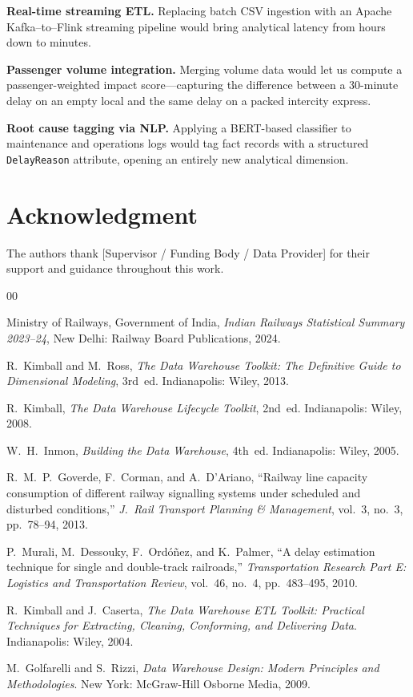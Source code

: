 \documentclass[conference]{IEEEtran}
\begin{document}
\textbf{Real-time streaming ETL.}
Replacing batch CSV ingestion with an Apache Kafka--to--Flink streaming
pipeline would bring analytical latency from hours down to minutes.

\textbf{Passenger volume integration.}
Merging volume data would let us compute a passenger-weighted impact
score---capturing the difference between a 30-minute delay on an empty
local and the same delay on a packed intercity express.

\textbf{Root cause tagging via NLP.}
Applying a BERT-based classifier to maintenance and operations logs would
tag fact records with a structured \texttt{DelayReason} attribute, opening
an entirely new analytical dimension.

\section*{Acknowledgment}
The authors thank [Supervisor / Funding Body / Data Provider]
for their support and guidance throughout this work.

\begin{thebibliography}{00}

Ministry of Railways, Government of India,
\textit{Indian Railways Statistical Summary 2023--24},
New Delhi: Railway Board Publications, 2024.

R.~Kimball and M.~Ross,
\textit{The Data Warehouse Toolkit: The Definitive Guide to Dimensional
Modeling}, 3rd~ed.
Indianapolis: Wiley, 2013.

R.~Kimball,
\textit{The Data Warehouse Lifecycle Toolkit}, 2nd~ed.
Indianapolis: Wiley, 2008.

W.~H.~Inmon,
\textit{Building the Data Warehouse}, 4th~ed.
Indianapolis: Wiley, 2005.

R.~M.~P.~Goverde, F.~Corman, and A.~D'Ariano,
``Railway line capacity consumption of different railway signalling
systems under scheduled and disturbed conditions,''
\textit{J.\ Rail Transport Planning \& Management},
vol.~3, no.~3, pp.~78--94, 2013.

P.~Murali, M.~Dessouky, F.~Ord\'o\~nez, and K.~Palmer,
``A delay estimation technique for single and double-track railroads,''
\textit{Transportation Research Part E: Logistics and Transportation
Review},
vol.~46, no.~4, pp.~483--495, 2010.

R.~Kimball and J.~Caserta,
\textit{The Data Warehouse ETL Toolkit: Practical Techniques for
Extracting, Cleaning, Conforming, and Delivering Data}.
Indianapolis: Wiley, 2004.

M.~Golfarelli and S.~Rizzi,
\textit{Data Warehouse Design: Modern Principles and Methodologies}.
New York: McGraw-Hill Osborne Media, 2009.

\end{thebibliography}
\end{document}

